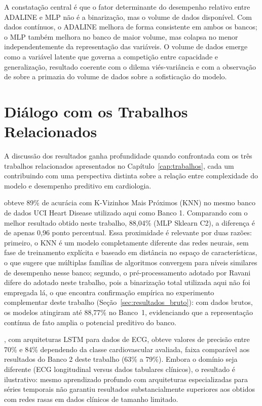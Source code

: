 A constata\c c\~ao central \'e que o fator determinante do desempenho relativo entre ADALINE e MLP n\~ao \'e a binariza\c c\~ao, mas o volume de dados dispon\'ivel. Com dados cont\'inuos, o ADALINE melhora de forma consistente em ambos os bancos; o MLP tamb\'em melhora no banco de maior volume, mas colapsa no menor independentemente da representa\c c\~ao das vari\'aveis. O volume de dados emerge como a vari\'avel latente que governa a competi\c c\~ao entre capacidade e generaliza\c c\~ao, resultado coerente com o dilema vi\'es-vari\^ancia \cite{braga2007,silva2016} e com a observa\c c\~ao de  sobre a primazia do volume de dados sobre a sofistica\c c\~ao do modelo.

\section{Di\'alogo com os Trabalhos Relacionados}
\label{sec:dialogo_literatura}

A discuss\~ao dos resultados ganha profundidade quando confrontada com os tr\^es trabalhos relacionados apresentados no Cap\'itulo~\ref{cap:trabalhos}, cada um contribuindo com uma perspectiva distinta sobre a rela\c c\~ao entre complexidade do modelo e desempenho preditivo em cardiologia.

 obteve 89\% de acur\'acia com K-Vizinhos Mais Pr\'oximos (KNN) no mesmo banco de dados UCI Heart Disease utilizado aqui como Banco 1. Comparando com o melhor resultado obtido neste trabalho, 88,04\% (MLP Sklearn C2), a diferen\c ca \'e de apenas 0,96 ponto percentual. Essa proximidade \'e relevante por duas raz\~oes: primeiro, o KNN \'e um modelo completamente diferente das redes neurais, sem fase de treinamento expl\'icita e baseado em dist\^ancia no espa\c co de caracter\'isticas, o que sugere que m\'ultiplas fam\'ilias de algoritmos convergem para n\'iveis similares de desempenho nesse banco; segundo, o pr\'e-processamento adotado por Ravani difere do adotado neste trabalho, pois a binariza\c c\~ao total utilizada aqui n\~ao foi empregada l\'a, o que encontra confirma\c c\~ao emp\'irica no experimento complementar deste trabalho (Se\c c\~ao~\ref{sec:resultados_bruto}): com dados brutos, os modelos atingiram at\'e 88,77\% no Banco~1, evidenciando que a representa\c c\~ao cont\'inua de fato amplia o potencial preditivo do banco.

, com arquiteturas LSTM para dados de ECG, obteve valores de precis\~ao entre 70\% e 84\% dependendo da classe cardiovascular avaliada, faixa compar\'avel aos resultados do Banco 2 deste trabalho (63\% a 79\%). Embora o dom\'inio seja diferente (ECG longitudinal versus dados tabulares cl\'inicos), o resultado \'e ilustrativo: mesmo aprendizado profundo com arquiteturas especializadas para s\'eries temporais n\~ao garantiu resultados substancialmente superiores aos obtidos com redes rasas em dados cl\'inicos de tamanho limitado.

